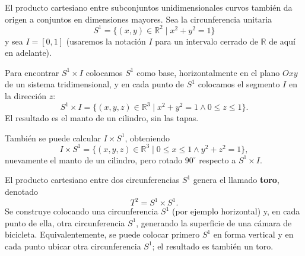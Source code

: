 El producto cartesiano entre subconjuntos unidimensionales curvos también
da origen a conjuntos en dimensiones mayores. Sea la circunferencia unitaria
\[
S^1 = \{(x,y)\in\mathbb{R}^2 \mid x^2+y^2=1\}
\]
y sea $I = [0,1]$ (usaremos la notación $I$ para un intervalo cerrado de
$\mathbb{R}$ de aquí en adelante).

\begin{ejemplo}
Para encontrar $S^1 \times I$ colocamos $S^1$ como base, horizontalmente en
el plano $Oxy$ de un sistema tridimensional, y en cada punto de $S^1$
colocamos el segmento $I$ en la dirección $z$:
\[
S^1 \times I = \{(x,y,z)\in\mathbb{R}^3 \mid x^2+y^2=1 \wedge 0\le z\le 1\}.
\]
El resultado es el manto de un cilindro, sin las tapas.

\begin{center}
\end{center}

También se puede calcular $I \times S^1$, obteniendo
\[
I \times S^1 = \{(x,y,z)\in\mathbb{R}^3 \mid 0\le x\le 1 \wedge y^2+z^2=1\},
\]
nuevamente el manto de un cilindro, pero rotado $90^\circ$ respecto a
$S^1\times I$.
\end{ejemplo}

\begin{ejemplo}[El toro]
El producto cartesiano entre dos circunferencias $S^1$ genera el llamado
\textbf{toro}, denotado
\[
T^2 = S^1 \times S^1 .
\]
Se construye colocando una circunferencia $S^1$ (por ejemplo horizontal) y,
en cada punto de ella, otra circunferencia $S^1$, generando la superficie
de una cámara de bicicleta. Equivalentemente, se puede colocar primero
$S^1$ en forma vertical y en cada punto ubicar otra circunferencia $S^1$;
el resultado es también un toro.

\begin{center}
\end{center}
\end{ejemplo}

